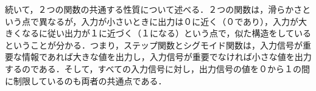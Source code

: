 \documentclass[dvipdfmx]{jsarticle}
\begin{document}
続いて，２つの関数の共通する性質について述べる．２つの関数は，滑らかさという点で異なるが，入力が小さいときに出力は０に近く（０であり），入力が大きくなるに従い出力が１に近づく（１になる）という点で，似た構造をしているということが分かる．つまり，ステップ関数とシグモイド関数は，入力信号が重要な情報であれば大きな値を出力し，入力信号が重要でなければ小さな値を出力するのである．そして，すべての入力信号に対し，出力信号の値を０から１の間に制限しているのも両者の共通点である．
\end{document}
